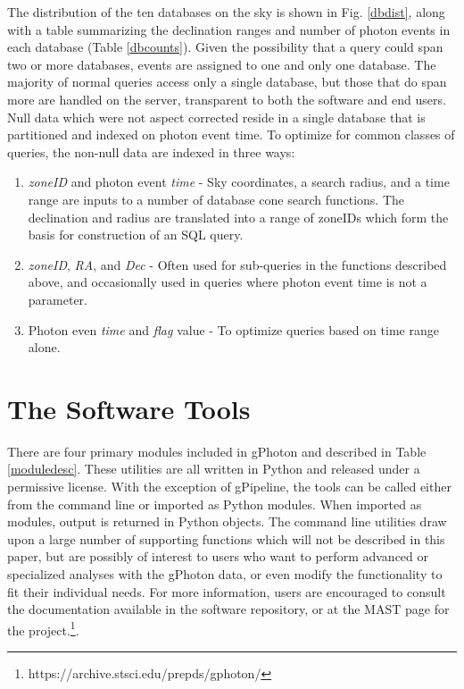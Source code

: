 \documentclass[preprint]{aastex}
\begin{document}
The distribution of the ten databases on the sky is shown in Fig. \ref{dbdist}, along with a table summarizing the declination ranges and number of photon events in each database (Table \ref{dbcounts}). Given the possibility that a query could span two or more databases, events are assigned to one and only one database. The majority of normal queries access only a single database, but those that do span more are handled on the server, transparent to both the software and end users.
	Null data which were not aspect corrected reside in a single database that is partitioned and indexed on photon event time. To optimize for common classes of queries, the non-null data are indexed in three ways:
\begin{enumerate}
	\item{\emph{zoneID} and photon event \emph{time} - Sky coordinates, a search radius, and a time range are inputs to a number of database cone search functions. The declination and radius are translated into a range of zoneIDs which form the basis for construction of an SQL query.}
	\item{\emph{zoneID}, \emph{RA}, and \emph{Dec} - Often used for sub-queries in the functions described above, and occasionally used in queries where photon event time is not a parameter.}
	\item{Photon even \emph{time} and \emph{flag} value - To optimize queries based on time range alone.}
\end{enumerate}

\section{The Software Tools}
\label{softwaretools}
There are four primary modules included in gPhoton and described in Table \ref{moduledesc}. These utilities are all written in Python and released under a permissive license. With the exception of gPipeline, the tools can be called either from the command line or imported as Python modules. When imported as modules, output is returned in Python objects. The command line utilities draw upon a large number of supporting functions which will not be described in this paper, but are possibly of interest to users who want to perform advanced or specialized analyses with the gPhoton data, or even modify the functionality to fit their individual needs. For more information, users are encouraged to consult the documentation available in the software repository, or at the MAST page for the project.\footnote{https://archive.stsci.edu/prepds/gphoton/}.
\end{document}
